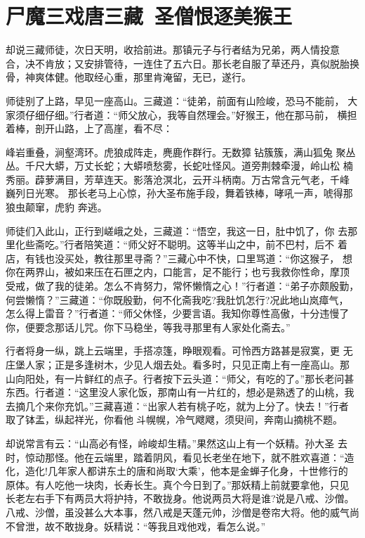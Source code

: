 \chapter{尸魔三戏唐三藏~圣僧恨逐美猴王}

却说三藏师徒，次日天明，收拾前进。那镇元子与行者结为兄弟，两人情投意
合，决不肯放；又安排管待，一连住了五六日。那长老自服了草还丹，真似脱胎换
骨，神爽体健。他取经心重，那里肯淹留，无已，遂行。

师徒别了上路，早见一座高山。三藏道：“徒弟，前面有山险峻，恐马不能前，
大家须仔细仔细。”行者道：“师父放心，我等自然理会。”好猴王，他在那马前，
横担着棒，剖开山路，上了高崖，看不尽：

峰岩重叠，涧壑湾环。虎狼成阵走，麂鹿作群行。无数獐钻簇簇，满山狐兔
聚丛丛。千尺大蟒，万丈长蛇；大蟒喷愁雾，长蛇吐怪风。道旁荆棘牵漫，岭山松
楠秀丽。薜萝满目，芳草连天。影落沧溟北，云开斗柄南。万古常含元气老，千峰
巍列日光寒。
那长老马上心惊，孙大圣布施手段，舞着铁棒，哮吼一声，唬得那狼虫颠窜，虎豹
奔逃。

师徒们入此山，正行到嵯峨之处，三藏道：“悟空，我这一日，肚中饥了，你
去那里化些斋吃。”行者陪笑道：“师父好不聪明。这等半山之中，前不巴村，后不
着店，有钱也没买处，教往那里寻斋？”三藏心中不快，口里骂道：“你这猴子，
想你在两界山，被如来压在石匣之内，口能言，足不能行；也亏我救你性命，摩顶
受戒，做了我的徒弟。怎么不肯努力，常怀懒惰之心！”行者道：“弟子亦颇殷勤，
何尝懒惰？”三藏道：“你既殷勤，何不化斋我吃?我肚饥怎行?况此地山岚瘴气，
怎么得上雷音？”行者道：“师父休怪，少要言语。我知你尊性高傲，十分违慢了
你，便要念那话儿咒。你下马稳坐，等我寻那里有人家处化斋去。”

行者将身一纵，跳上云端里，手搭凉篷，睁眼观看。可怜西方路甚是寂寞，更
无庄堡人家；正是多逢树木，少见人烟去处。看多时，只见正南上有一座高山。那
山向阳处，有一片鲜红的点子。行者按下云头道：“师父，有吃的了。”那长老问甚
东西。行者道：“这里没人家化饭，那南山有一片红的，想必是熟透了的山桃，我
去摘几个来你充饥。”三藏喜道：“出家人若有桃子吃，就为上分了。快去！”行者
取了钵盂，纵起祥光，你看他斗幌幌，冷气飕飕，须臾间，奔南山摘桃不题。

却说常言有云：“山高必有怪，岭峻却生精。”果然这山上有一个妖精。孙大圣
去时，惊动那怪。他在云端里，踏着阴风，看见长老坐在地下，就不胜欢喜道：“造
化，造化!几年家人都讲东土的唐和尚取‘大乘’，他本是金蝉子化身，十世修行的
原体。有人吃他一块肉，长寿长生。真个今日到了。”那妖精上前就要拿他，只见
长老左右手下有两员大将护持，不敢拢身。他说两员大将是谁?说是八戒、沙僧。
八戒、沙僧，虽没甚么大本事，然八戒是天蓬元帅，沙僧是卷帘大将。他的威气尚
不曾泄，故不敢拢身。妖精说：“等我且戏他戏，看怎么说。”

